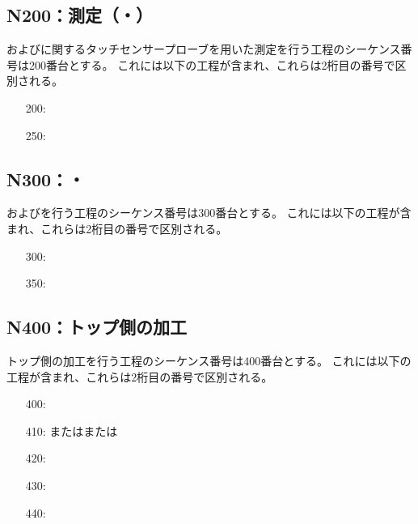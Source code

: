 \subsection{N200：測定（\Dimple・\ReliefGroove）}
\Dimple および\ReliefGroove に関するタッチセンサープローブを用いた測定を行う工程のシーケンス番号は200番台とする。
これには以下の工程が含まれ、これらは2桁目の番号で区別される。
\begin{enumerate}
\item[200:] \DimpleMeasurement
\item[250:] \ReliefGrooveMeasurement
\end{enumerate}


\subsection{N300：\DimpleMilling ・\ReliefGrooveMilling}
\DimpleMilling および\ReliefGrooveMilling を行う工程のシーケンス番号は300番台とする。
これには以下の工程が含まれ、これらは2桁目の番号で区別される。
\begin{enumerate}
\item[300:] \DimpleMilling
\item[350:] \ReliefGrooveMilling
\end{enumerate}


\subsection{N400：トップ側の加工}
トップ側の加工を行う工程のシーケンス番号は400番台とする。
これには以下の工程が含まれ、これらは2桁目の番号で区別される。
\begin{enumerate}
\item[400:] \TopEndFacecutMilling
\item[410:] \TopOutcutMilling または\EndFaceBoringMilling または\IncutBoringMilling
\item[420:] \KeywayMilling
\item[430:] \TopEndFaceOutCChamferMilling
\item[440:] \TopEndFaceInCChamferMilling
\end{enumerate}


